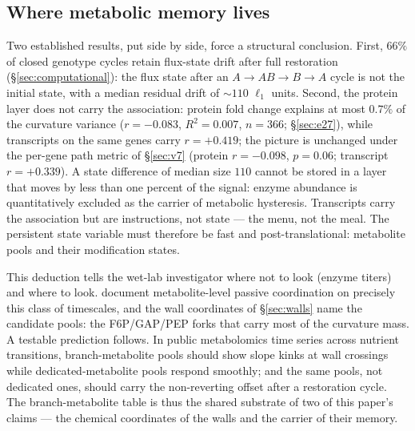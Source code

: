 \documentclass[11pt,a4paper]{article}
\theoremstyle{plain}
\theoremstyle{definition}
\theoremstyle{remark}
\begin{document}
\subsection{Where metabolic memory lives}\label{sec:memory}

Two established results, put side by side, force a structural
conclusion. First, $66\%$ of closed genotype cycles retain
flux-state drift after full restoration (\S\ref{sec:computational}):
the flux state after an $A \to AB \to B \to A$ cycle is not the
initial state, with a median residual drift of $\sim 110$ $\ell_1$
units. Second, the protein layer does not carry the association:
protein fold change explains at most $0.7\%$ of the curvature
variance ($r = -0.083$, $R^2 = 0.007$, $n = 366$;
\S\ref{sec:e27}), while transcripts on the same genes carry $r =
+0.419$; the picture is unchanged under the per-gene path metric
of \S\ref{sec:v7} (protein $r = -0.098$, $p = 0.06$; transcript
$r = +0.339$). A
state difference of median size $110$ cannot be stored
in a layer that moves by less than one percent of the signal:
enzyme abundance is quantitatively excluded as the carrier of
metabolic hysteresis. Transcripts carry the association but are
instructions, not state --- the menu, not the meal. The persistent
state variable must therefore be fast and post-translational:
metabolite pools and their modification states.

This deduction tells the wet-lab investigator where not to look
(enzyme titers) and where to look. \citet{kochanowski2013}
document metabolite-level passive coordination on precisely this
class of timescales, and the wall coordinates of
\S\ref{sec:walls} name the candidate pools: the
F6P/GAP/PEP forks that carry most of the curvature mass. A
testable prediction follows. In public metabolomics time series
across nutrient transitions, branch-metabolite pools should show
slope kinks at wall crossings while dedicated-metabolite pools
respond smoothly; and the same pools, not dedicated ones, should
carry the non-reverting offset after a restoration cycle. The
branch-metabolite table is thus the shared substrate of two of
this paper's claims --- the chemical coordinates of the walls and
the carrier of their memory.
\end{document}
